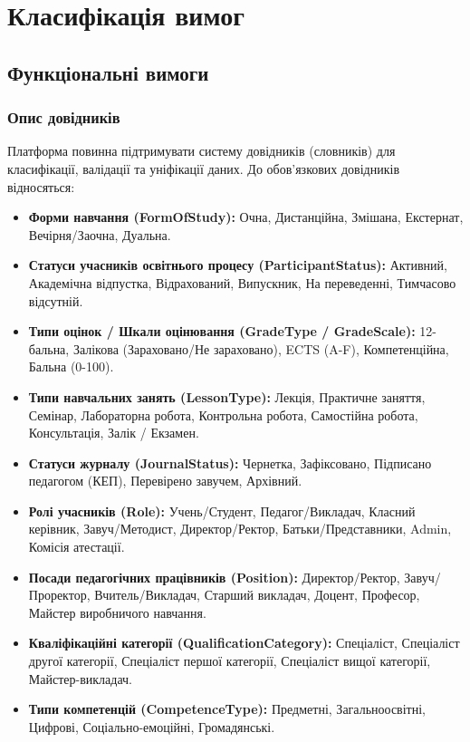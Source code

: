 \documentclass{article}
\begin{document}
\newpage
\section{Класифікація вимог}

\subsection{Функціональні вимоги}

\subsubsection{Опис довідників}
Платформа повинна підтримувати систему довідників (словників) для класифікації, валідації та уніфікації даних. До обов'язкових довідників відносяться:
\begin{itemize}
    \item \textbf{Форми навчання (FormOfStudy):} Очна, Дистанційна, Змішана, Екстернат, Вечірня/Заочна, Дуальна.
    \item \textbf{Статуси учасників освітнього процесу (ParticipantStatus):} Активний, Академічна відпустка, Відрахований, Випускник, На переведенні, Тимчасово відсутній.
    \item \textbf{Типи оцінок / Шкали оцінювання (GradeType / GradeScale):} 12-бальна, Залікова (Зараховано/Не зараховано), ECTS (A-F), Компетенційна, Бальна (0-100).
    \item \textbf{Типи навчальних занять (LessonType):} Лекція, Практичне заняття, Семінар, Лабораторна робота, Контрольна робота, Самостійна робота, Консультація, Залік / Екзамен.
    \item \textbf{Статуси журналу (JournalStatus):} Чернетка, Зафіксовано, Підписано педагогом (КЕП), Перевірено завучем, Архівний.
    \item \textbf{Ролі учасників (Role):} Учень/Студент, Педагог/Викладач, Класний керівник, Завуч/Методист, Директор/Ректор, Батьки/Представники, Admin, Комісія атестації.
    \item \textbf{Посади педагогічних працівників (Position):} Директор/Ректор, Завуч/Проректор, Вчитель/Викладач, Старший викладач, Доцент, Професор, Майстер виробничого навчання.
    \item \textbf{Кваліфікаційні категорії (QualificationCategory):} Спеціаліст, Спеціаліст другої категорії, Спеціаліст першої категорії, Спеціаліст вищої категорії, Майстер-викладач.
    \item \textbf{Типи компетенцій (CompetenceType):} Предметні, Загальноосвітні, Цифрові, Соціально-емоційні, Громадянські.

\end{itemize}
\end{document}
